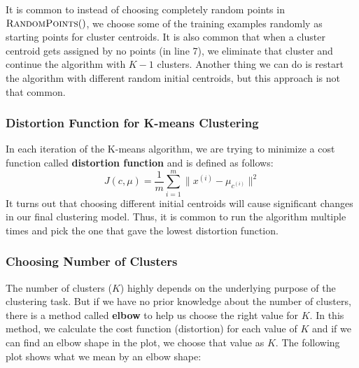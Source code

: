 \documentclass[a4paper, 12pt]{book}
\begin{document}
It is common to instead of choosing completely random points in $\Call{RandomPoints}$, we choose some of the training examples randomly as starting points for cluster centroids. It is also common that when a cluster centroid gets assigned by no points (in line 7), we eliminate that cluster and continue the algorithm with $K-1$ clusters. Another thing we can do is restart the algorithm with different random initial centroids, but this approach is not that common.

\subsubsection{Distortion Function for K-means Clustering}

In each iteration of the K-means algorithm, we are trying to minimize a cost function called \textbf{distortion function} and is defined as follows: \[J(c,\mu) = \frac{1}{m}\sum_{i=1}^m \|x^{(i)} - \mu_{c^{(i)}}\|^2\] It turns out that choosing different initial centroids will cause significant changes in our final clustering model. Thus, it is common to run the algorithm multiple times and pick the one that gave the lowest distortion function.

\subsubsection{Choosing Number of Clusters}

The number of clusters ($K$) highly depends on the underlying purpose of the clustering task. But if we have no prior knowledge about the number of clusters, there is a method called \textbf{elbow} to help us choose the right value for $K$. In this method, we calculate the cost function (distortion) for each value of $K$ and if we can find an elbow shape in the plot, we choose that value as $K$. The following plot shows what we mean by an elbow shape:

\begin{center}
\end{center}
\end{document}
